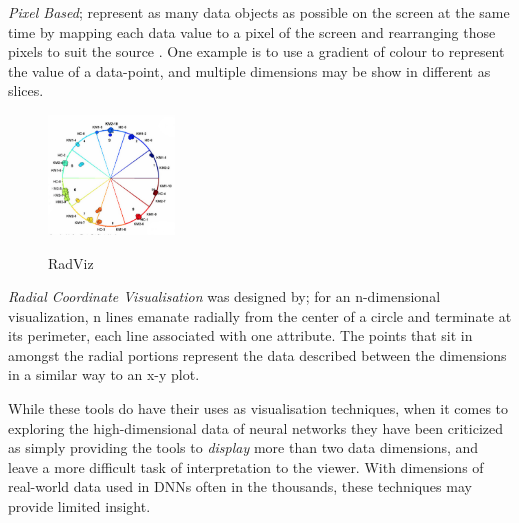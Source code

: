 \documentclass[a4paper,11pt,titlepage]{article}
\begin{document}
		\textit{Pixel Based}; represent as many data objects as possible on the screen at the same time by mapping each data value to a pixel of the screen and rearranging those pixels to suit the source \cite{Keim2000}. One example is to use a gradient of colour to represent the value of a data-point, and multiple dimensions may be show in different as slices.
		\par 
		 		
	\begin{figure}[H]
    			\centering	
			{{\includegraphics[width=0.3\textwidth]
    				{img/battista_vertices} 
    			}}%
    			\caption{RadViz}%
    		\label{fig:lascaux}
	\end{figure}	 		
 		
 		
		\textit{Radial Coordinate Visualisation} was designed by\cite{Hoffman1999}; for an n-dimensional visualization, n lines emanate radially from the center of a circle and terminate at its perimeter, each line associated with one attribute. The points that sit in amongst the radial portions represent the data described between the dimensions in a similar way to an x-y plot.
		
	\par 
	While these tools do have their uses as visualisation techniques, when it comes to exploring the high-dimensional data of neural networks they have been criticized \cite{Maaten2008} as simply providing the tools to \textit{display} more than two data dimensions, and leave a more difficult task of interpretation to the viewer. With dimensions of real-world data used in DNNs often in the thousands, these techniques may provide limited insight.
\end{document}
